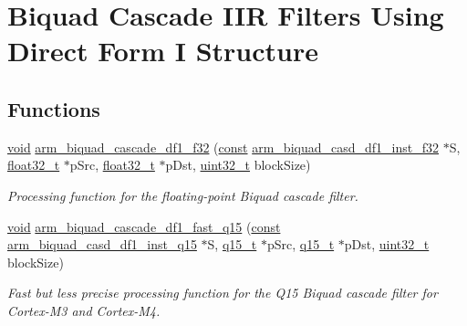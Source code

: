 \hypertarget{group___biquad_cascade_d_f1}{\section{Biquad Cascade I\-I\-R Filters Using Direct Form I Structure}
\label{group___biquad_cascade_d_f1}
}
\subsection*{Functions}
\begin{DoxyCompactItemize}
\item 
\hyperlink{group___n_a_m_e_ga18028b8badbf1ea7e704ccac3c488e82}{void} \hyperlink{group___biquad_cascade_d_f1_gaa0dbe330d763e3c1d8030b3ef12d5bdc}{arm\-\_\-biquad\-\_\-cascade\-\_\-df1\-\_\-f32} (\hyperlink{group___n_a_m_e_ga7ae6d0e43244213b34de2c2b9aa30da6}{const} \hyperlink{structarm__biquad__casd__df1__inst__f32}{arm\-\_\-biquad\-\_\-casd\-\_\-df1\-\_\-inst\-\_\-f32} $\ast$S, \hyperlink{arm__math_8h_a4611b605e45ab401f02cab15c5e38715}{float32\-\_\-t} $\ast$p\-Src, \hyperlink{arm__math_8h_a4611b605e45ab401f02cab15c5e38715}{float32\-\_\-t} $\ast$p\-Dst, \hyperlink{stdint_8h_a435d1572bf3f880d55459d9805097f62}{uint32\-\_\-t} block\-Size)
\begin{DoxyCompactList}\small\item\em Processing function for the floating-\/point Biquad cascade filter. \end{DoxyCompactList}\item 
\hyperlink{group___n_a_m_e_ga18028b8badbf1ea7e704ccac3c488e82}{void} \hyperlink{group___biquad_cascade_d_f1_gaffb9792c0220882efd4c58f3c6a05fd7}{arm\-\_\-biquad\-\_\-cascade\-\_\-df1\-\_\-fast\-\_\-q15} (\hyperlink{group___n_a_m_e_ga7ae6d0e43244213b34de2c2b9aa30da6}{const} \hyperlink{structarm__biquad__casd__df1__inst__q15}{arm\-\_\-biquad\-\_\-casd\-\_\-df1\-\_\-inst\-\_\-q15} $\ast$S, \hyperlink{arm__math_8h_ab5a8fb21a5b3b983d5f54f31614052ea}{q15\-\_\-t} $\ast$p\-Src, \hyperlink{arm__math_8h_ab5a8fb21a5b3b983d5f54f31614052ea}{q15\-\_\-t} $\ast$p\-Dst, \hyperlink{stdint_8h_a435d1572bf3f880d55459d9805097f62}{uint32\-\_\-t} block\-Size)
\begin{DoxyCompactList}\small\item\em Fast but less precise processing function for the Q15 Biquad cascade filter for Cortex-\/\-M3 and Cortex-\/\-M4. \end{DoxyCompactList}\item 

\end{DoxyCompactItemize}
